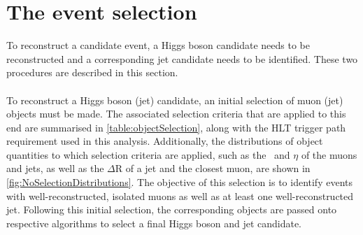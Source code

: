 \section{The \cHZZ event selection}
\label{sec:Selection}
To reconstruct a \cHZZ candidate event, a Higgs boson candidate needs to be reconstructed and a corresponding jet candidate needs to be identified. These two procedures are described in this section. \\
\\
To reconstruct a Higgs boson (jet) candidate, an initial selection of muon (jet) objects must be made. The associated selection criteria that are applied to this end are summarised in \autoref{table:objectSelection}, along with the HLT trigger path requirement used in this analysis. Additionally, the distributions of object quantities to which selection criteria are applied, such as the \pt\, and $\eta$ of the muons and jets, as well as the $\Delta$R of a jet and the closest muon, are shown in \autoref{fig:NoSelectionDistributions}. The objective of this selection is to identify events with well-reconstructed, isolated muons as well as at least one well-reconstructed jet. Following this initial selection, the corresponding objects are passed onto respective algorithms to select a final Higgs boson and jet candidate. 

